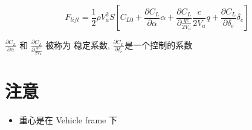 \documentclass[UTF8,a4paper,10pt,nocolorlinks]{ctexart}
\begin{document}
  \begin{equation}
    F_{lift} = \frac{1}{2} \rho V_{a}^{2} S \left[ C_{L0} + \frac{\partial C_{L}}{\partial \alpha} \alpha +  \frac{\partial C_{L}}{\partial \frac{qc}{2 V_{a}}} \frac{c}{2 V_{a}}q + \frac{\partial C_{L}}{\partial \delta_{e}} \delta_{e} \right] 
  \end{equation}
  
  $\frac{\partial C_{L}}{\partial \alpha}$ 和 $\frac{\partial C_{L}}{\partial \frac{qc}{2 V_{a}}}$ 被称为 稳定系数, $\frac{\partial C_{L}}{\partial \delta_{e}}$是一个控制的系数

  
  
  \clearpage





    \section{注意}
    \begin{itemize}
      \item 重心是在 Vehicle frame 下
    \end{itemize}
\end{document}
